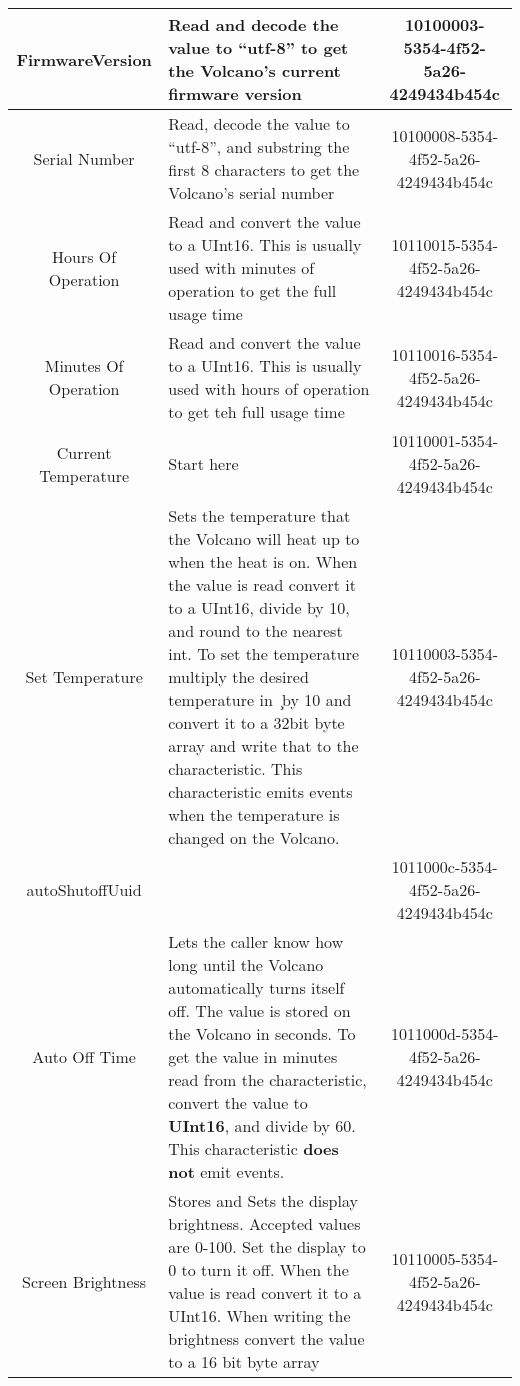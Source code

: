 \begin{longtable}{c|p{2.1in}|c}
FirmwareVersion&Read and decode the value to ``utf-8'' to get the Volcano's current firmware version&10100003-5354-4f52-5a26-4249434b454c\\ \hline

Serial Number&Read, decode the value to ``utf-8'', and substring the first 8 characters to get the Volcano's serial number &10100008-5354-4f52-5a26-4249434b454c\\ \hline

Hours Of Operation&Read and convert the value to a UInt16.  This is usually used with minutes of operation to get the full usage time&10110015-5354-4f52-5a26-4249434b454c\\ \hline

Minutes Of Operation&Read and convert the value to a UInt16.  This is usually used with hours of operation to get teh full usage time &10110016-5354-4f52-5a26-4249434b454c\\ \hline

Current Temperature&Start here&10110001-5354-4f52-5a26-4249434b454c\\ \hline

Set Temperature&
Sets the temperature that the Volcano will heat up to when the heat is on.
When the value is read convert it to a UInt16, divide by 10, and round to the nearest int. 
To set the temperature multiply the desired temperature in \c\ by 10
and convert it to a 32bit byte array and write that to the characteristic.
This characteristic emits events when the temperature is changed on the Volcano.& 10110003-5354-4f52-5a26-4249434b454c\\ \hline

autoShutoffUuid&&1011000c-5354-4f52-5a26-4249434b454c\\ \hline
Auto Off Time&Lets the caller know how long until the Volcano automatically turns itself off.
The value is stored on the Volcano in seconds.
To get the value in minutes read from the characteristic,
convert the value to \textbf{UInt16}, and divide by 60.
This characteristic \textbf{does not} emit events. &1011000d-5354-4f52-5a26-4249434b454c\\ \hline

Screen Brightness&Stores and Sets the display brightness.
Accepted values are 0-100.  
Set the display to 0 to turn it off. 
When the value is read convert it to a UInt16. 
When writing the brightness convert the value to a 16 bit byte array &10110005-5354-4f52-5a26-4249434b454c\\ \hline
\end{longtable}
